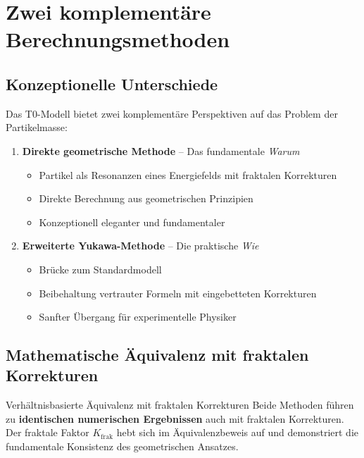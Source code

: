 \documentclass[12pt,a4paper]{article}
\begin{document}
\section{Zwei komplement\"a{}re Berechnungsmethoden}
\label{sec:two_calculation_methods}

\subsection{Konzeptionelle Unterschiede}
\label{subsec:conceptual_differences}

Das T0-Modell bietet zwei komplement\"a{}re Perspektiven auf das Problem der Partikelmasse:

\begin{enumerate}
	\item \textbf{Direkte geometrische Methode} -- Das fundamentale \textit{Warum}
	\begin{itemize}
		\item Partikel als Resonanzen eines Energiefelds mit fraktalen Korrekturen
		\item Direkte Berechnung aus geometrischen Prinzipien
		\item Konzeptionell eleganter und fundamentaler
	\end{itemize}
	
	\item \textbf{Erweiterte Yukawa-Methode} -- Die praktische \textit{Wie}
	\begin{itemize}
		\item Br\"u{}cke zum Standardmodell
		\item Beibehaltung vertrauter Formeln mit eingebetteten Korrekturen
		\item Sanfter \"U{}bergang f\"ur experimentelle Physiker
	\end{itemize}
\end{enumerate}

\subsection{Mathematische \"A{}quivalenz mit fraktalen Korrekturen}
\label{subsec:mathematical_equivalence}

\begin{schluessergebnis}{Verh\"altnisbasierte \"A{}quivalenz mit fraktalen Korrekturen}{}
	Beide Methoden f\"u{}hren zu \textbf{identischen numerischen Ergebnissen} auch mit fraktalen Korrekturen. Der fraktale Faktor $K_{\text{frak}}$ hebt sich im \"A{}quivalenzbeweis auf und demonstriert die fundamentale Konsistenz des geometrischen Ansatzes.
\end{schluessergebnis}
\end{document}
